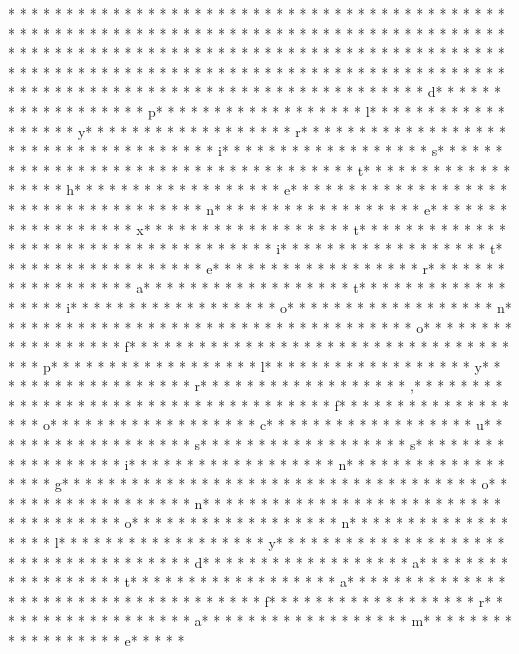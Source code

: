 * * *  * * *  * * *  *  * * *  *  * * *  * 	* * *  * * *  * * *  *  * * *  *  * * *  * 	* * *  * * *  * * *  *  * * *  *  * * *  * * *  * * *  *  * * *  *  * * *  * * *  * * *  *  * * *  *  * * *  *  * * *  * * *  * * *  *  * * *  *  * * *  *  * * *  * * *  * * *  *  * * *  *  * * *  *  * * *  * * *  * * *  *  * * *  *  * * *  *  * * *  * * *  * * *  *  * * *  *  * * *  *  * * *  * * *  * * *  *  * * *  *  * * *  *  * * *  * * *  * * *  *  * * *  *  * * *  *  * * *  * * *  * * *  *  * * *  *  * * *  * d* * *  * * *  * * *  *  * * *  *  * * *  * p* * *  * * *  * * *  *  * * *  *  * * *  * l* * *  * * *  * * *  *  * * *  *  * * *  * y* * *  * * *  * * *  *  * * *  *  * * *  * r* * *  * * *  * * *  *  * * *  *  * * *  *  * * *  * * *  * * *  *  * * *  *  * * *  * i* * *  * * *  * * *  *  * * *  *  * * *  * s* * *  * * *  * * *  *  * * *  *  * * *  *  * * *  * * *  * * *  *  * * *  *  * * *  * t* * *  * * *  * * *  *  * * *  *  * * *  * h* * *  * * *  * * *  *  * * *  *  * * *  * e* * *  * * *  * * *  *  * * *  *  * * *  *  * * *  * * *  * * *  *  * * *  *  * * *  * n* * *  * * *  * * *  *  * * *  *  * * *  * e* * *  * * *  * * *  *  * * *  *  * * *  * x* * *  * * *  * * *  *  * * *  *  * * *  * t* * *  * * *  * * *  *  * * *  *  * * *  *  * * *  * * *  * * *  *  * * *  *  * * *  * i* * *  * * *  * * *  *  * * *  *  * * *  * t* * *  * * *  * * *  *  * * *  *  * * *  * e* * *  * * *  * * *  *  * * *  *  * * *  * r* * *  * * *  * * *  *  * * *  *  * * *  * a* * *  * * *  * * *  *  * * *  *  * * *  * t* * *  * * *  * * *  *  * * *  *  * * *  * i* * *  * * *  * * *  *  * * *  *  * * *  * o* * *  * * *  * * *  *  * * *  *  * * *  * n* * *  * * *  * * *  *  * * *  *  * * *  *  * * *  * * *  * * *  *  * * *  *  * * *  * o* * *  * * *  * * *  *  * * *  *  * * *  * f* * *  * * *  * * *  *  * * *  *  * * *  *  * * *  * * *  * * *  *  * * *  *  * * *  * p* * *  * * *  * * *  *  * * *  *  * * *  * l* * *  * * *  * * *  *  * * *  *  * * *  * y* * *  * * *  * * *  *  * * *  *  * * *  * r* * *  * * *  * * *  *  * * *  *  * * *  * ,* * *  * * *  * * *  *  * * *  *  * * *  *  * * *  * * *  * * *  *  * * *  *  * * *  * f* * *  * * *  * * *  *  * * *  *  * * *  * o* * *  * * *  * * *  *  * * *  *  * * *  * c* * *  * * *  * * *  *  * * *  *  * * *  * u* * *  * * *  * * *  *  * * *  *  * * *  * s* * *  * * *  * * *  *  * * *  *  * * *  * s* * *  * * *  * * *  *  * * *  *  * * *  * i* * *  * * *  * * *  *  * * *  *  * * *  * n* * *  * * *  * * *  *  * * *  *  * * *  * g* * *  * * *  * * *  *  * * *  *  * * *  *  * * *  * * *  * * *  *  * * *  *  * * *  * o* * *  * * *  * * *  *  * * *  *  * * *  * n* * *  * * *  * * *  *  * * *  *  * * *  *  * * *  * * *  * * *  *  * * *  *  * * *  * o* * *  * * *  * * *  *  * * *  *  * * *  * n* * *  * * *  * * *  *  * * *  *  * * *  * l* * *  * * *  * * *  *  * * *  *  * * *  * y* * *  * * *  * * *  *  * * *  *  * * *  *  * * *  * * *  * * *  *  * * *  *  * * *  * d* * *  * * *  * * *  *  * * *  *  * * *  * a* * *  * * *  * * *  *  * * *  *  * * *  * t* * *  * * *  * * *  *  * * *  *  * * *  * a* * *  * * *  * * *  *  * * *  *  * * *  *  * * *  * * *  * * *  *  * * *  *  * * *  * f* * *  * * *  * * *  *  * * *  *  * * *  * r* * *  * * *  * * *  *  * * *  *  * * *  * a* * *  * * *  * * *  *  * * *  *  * * *  * m* * *  * * *  * * *  *  * * *  *  * * *  * e* * *  * * 